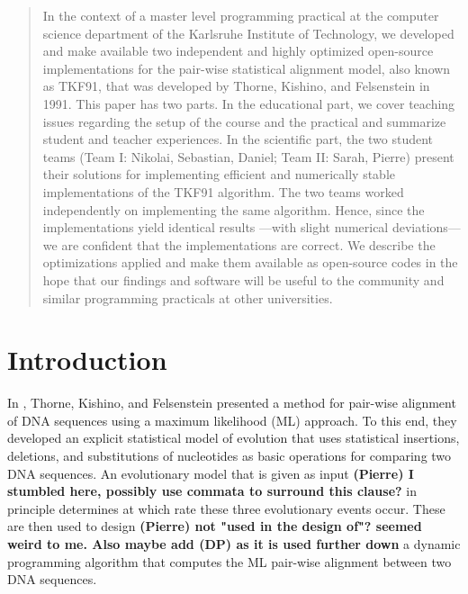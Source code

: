 \documentclass[runningheads,a4paper]{llncs}
\newcommand{\keywords}[1]{\par\addvspace\baselineskip
\noindent\keywordname\enspace\ignorespaces#1}
\begin{document}
\begin{abstract}
In the context of a master level programming practical at the computer science department of the Karlsruhe Institute of Technology,
we developed and make available two independent and highly optimized open-source implementations for the pair-wise
statistical alignment model, also known as TKF91, that was developed by Thorne, Kishino, and Felsenstein in 1991.
This paper has two parts.
In the educational part, we cover teaching issues regarding the setup of the course and the practical and summarize student and teacher experiences.
In the scientific part, the two student teams (Team I: Nikolai, Sebastian, Daniel; Team II: Sarah, Pierre) present their
solutions for implementing efficient and numerically stable implementations of the TKF91 algorithm.
The two teams worked independently on implementing the same algorithm. Hence, since the implementations yield identical results ---with slight numerical deviations---
we are confident that the implementations are correct. We describe the optimizations applied and make them available as open-source codes
in the hope that our findings and software will be useful to the community and similar programming practicals at other universities.


\end{abstract}


\section{Introduction}
\label{sec:introduction}

In \cite{TKF91}, Thorne, Kishino, and Felsenstein presented a method for pair-wise alignment of DNA sequences using a maximum likelihood (ML) approach.
To this end, they developed an explicit statistical model of evolution that uses statistical insertions, deletions, and substitutions of nucleotides
as basic operations for comparing two DNA sequences.
An evolutionary model that is given as input \textbf{(Pierre) I stumbled here, possibly use commata to surround this clause?} in principle determines at which rate these three evolutionary events occur.
These are then used to design \textbf{(Pierre) not "used in the design of"? seemed weird to me. Also maybe add (DP) as it is used further down} a dynamic programming algorithm that computes the ML pair-wise alignment between two DNA sequences.
\end{document}
